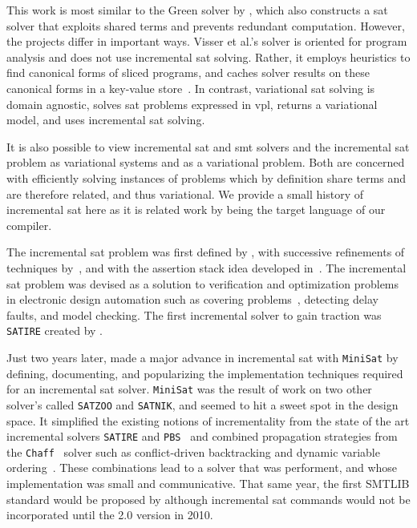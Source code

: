 \label{section:related-work:similar-solvers}
%
This work is most similar to the Green solver by \citet{VGD:FSE12}, which also
constructs a \ac{sat} solver that exploits shared terms and prevents redundant
computation. However, the projects differ in important ways. Visser et al.'s
solver is oriented for program analysis and does not use incremental \ac{sat}
solving. Rather, it employs heuristics to find canonical forms of sliced
programs, and caches solver results on these canonical forms in a key-value
store~\citep{redis}. In contrast, variational \ac{sat} solving is domain
agnostic, solves \ac{sat} problems expressed in \ac{vpl}, returns a variational
model, and uses incremental \ac{sat} solving.

It is also possible to view incremental \ac{sat} and \ac{smt} solvers and the
incremental \ac{sat} problem as variational systems and as a variational
problem. Both are concerned with efficiently solving instances of problems which
by definition share terms and are therefore related, and thus variational. We
provide a small history of incremental \ac{sat} here as it is related work by
being the target language of our compiler.

The incremental \ac{sat} problem was first defined by \citet{hooker_1993}, with
successive refinements of techniques by~\citet{branch-bound}, and with the
assertion stack idea developed in~\citet{kim2000solving}. The incremental
\ac{sat} problem was devised as a solution to verification and optimization
problems in electronic design automation such as covering
problems~\cite{10.1145/217474.217603}, detecting delay
faults\cite{10.1145/343647.343801}, and model
checking\cite{Clarke:1986:AVF:5397.5399}. The first incremental solver to gain
traction was \texttt{SATIRE} created by \citet{10.1145/378239.379019}.

Just two years later, \citet{10.1007/978-3-540-24605-3_37} made a major advance
in incremental \ac{sat} with \texttt{MiniSat} by defining, documenting, and
popularizing the implementation techniques required for an incremental \ac{sat}
solver. \texttt{MiniSat} was the result of work on two other solver's called
\texttt{SATZOO} and \texttt{SATNIK}, and seemed to hit a sweet spot in the
design space. It simplified the existing notions of incrementality from the
state of the art incremental solvers \texttt{SATIRE} and
\texttt{PBS}~\cite{10.1145/774572.774638} and combined propagation strategies
from the \texttt{Chaff}~\cite{Moskewicz:2001:CEE:378239.379017} solver such as
conflict-driven backtracking\cite{Zhang:2001:ECD:603095.603153} and dynamic
variable ordering~\cite{Moskewicz:2001:CEE:378239.379017}. These combinations
lead to a solver that was performent, and whose implementation was small and
communicative. That same year, the first SMTLIB standard would be proposed by
\citet{SMT-LIBformat} although incremental \ac{sat} commands would not be
incorporated until the 2.0 version\cite{BarST-RR-10} in 2010.

